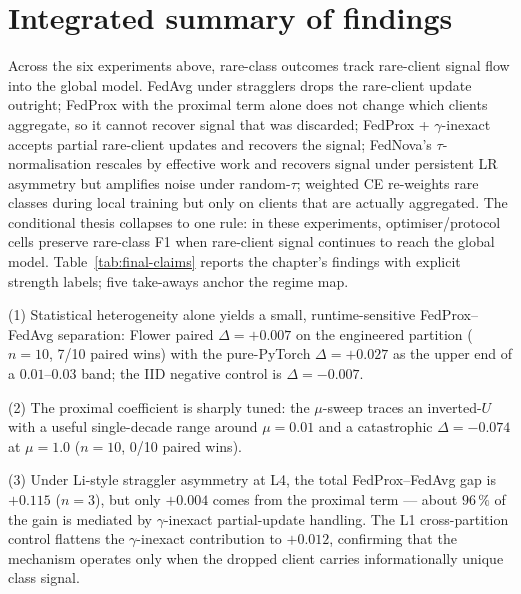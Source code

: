 \documentclass[11pt,a4paper]{report}
\begin{document}

\section{Integrated summary of findings}
\label{sec:integrated-summary}

Across the six experiments above, rare-class outcomes track rare-client
signal flow into the global model. FedAvg under stragglers drops the
rare-client update outright; FedProx with the proximal term alone does
not change which clients aggregate, so it cannot recover signal that was
discarded; FedProx + $\gamma$-inexact accepts partial rare-client updates
and recovers the signal; FedNova's $\tau$-normalisation rescales by
effective work and recovers signal under persistent LR asymmetry but
amplifies noise under random-$\tau$; weighted CE re-weights rare classes
during local training but only on clients that are actually aggregated.
The conditional thesis collapses to one rule: in these experiments,
optimiser/protocol cells preserve rare-class F1 when rare-client signal
continues to reach the global model. Table~\ref{tab:final-claims} reports the chapter's findings
with explicit strength labels; five take-aways anchor the regime map.

(1) Statistical heterogeneity alone yields a small, runtime-sensitive
FedProx--FedAvg separation: Flower paired $\Delta = +0.007$ on the
engineered partition ($n=10$, 7/10 paired wins) with the pure-PyTorch
$\Delta = +0.027$ as the upper end of a $0.01$--$0.03$ band; the IID
negative control is $\Delta = -0.007$.

(2) The proximal coefficient is sharply tuned: the $\mu$-sweep traces an
inverted-$U$ with a useful single-decade range around $\mu = 0.01$ and a
catastrophic $\Delta = -0.074$ at $\mu = 1.0$ ($n=10$, 0/10 paired wins).

(3) Under Li-style straggler asymmetry at L4, the total FedProx--FedAvg gap
is $+0.115$ ($n=3$), but only $+0.004$ comes from the proximal term ---
about $96\,\%$ of the gain is mediated by $\gamma$-inexact partial-update
handling. The L1 cross-partition control flattens the $\gamma$-inexact
contribution to $+0.012$, confirming that the mechanism operates only when
the dropped client carries informationally unique class signal.
\end{document}
